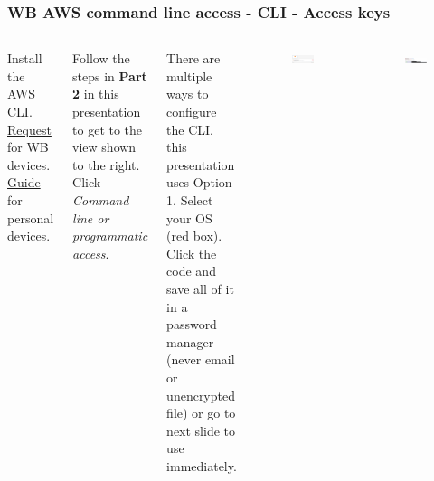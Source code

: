 \documentclass[aspectratio=169]{beamer} %
\begin{document}
\begin{frame}
	\frametitle{WB AWS command line access - CLI - Access keys}
	\begin{columns}[c]

		Install the AWS CLI.
		\href{https://worldbankgroup.service-now.com/wbg?id=wbg_sc_catalog&sys_id=bd1e71b86f16d340db112d232e3ee4b7}{Request}
		for WB devices.
		\href{https://docs.aws.amazon.com/cli/latest/userguide/getting-started-install.html}{Guide} 
		for personal devices.

		\vspace{.5cm}

		Follow the steps in \textbf{Part 2} in this presentation
		to get to the view shown to the right.	
		Click \textit{Command line or programmatic access}.
		
		\vspace{.5cm} 
		
		There are multiple ways to configure the CLI, 
		this presentation uses Option 1. 
		Select your OS (red box).
		Click the code and save all of it in a password manager 
		(never email or unencrypted file) 
		or go to next slide to use immediately.
		
		\begin{figure}
			\centering
			\includegraphics[width=1\textwidth]{./img/logon-2.png}
		\end{figure}
		\begin{figure}
			\centering
			\includegraphics[width=1\textwidth]{./img/aws-cli-get-keys.png}
		\end{figure}
		
	\end{columns}
\end{frame}
\end{document}
